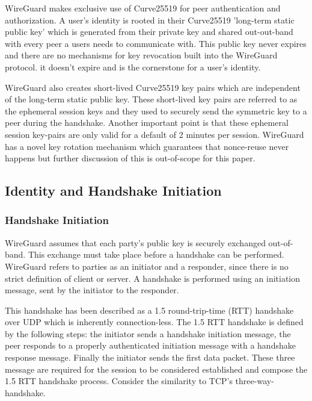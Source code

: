 \documentclass [11pt, proquest] {uwthesis}[2020/02/24]
\begin{document}
WireGuard makes exclusive use of Curve25519 for peer authentication and authorization. A user's identity is rooted in their Curve25519 'long-term static public key' which is generated from their private key and shared out-out-band with every peer a users needs to communicate with. 
This public key never expires and there are no mechanisms for key revocation built into the WireGuard protocol. it doesn't expire and is the cornerstone for a user's identity. 

WireGuard also creates short-lived Curve25519 key pairs which are independent of the long-term static public key. These short-lived key pairs are referred to as the ephemeral session keys and they used to securely send the symmetric key to a peer during the handshake. Another important point is that these ephemeral session key-pairs are only valid for a default of 2 minutes per session. WireGuard has a novel key rotation mechanism which guarantees that nonce-reuse never happens but further discussion of this is out-of-scope for this paper. 

\subsection {Identity and Handshake Initiation}

\subsubsection{Handshake Initiation}
WireGuard assumes that each party's public key is securely exchanged out-of-band. This exchange must take place before a handshake can be performed. WireGuard refers to parties as an initiator and a responder, since there is no strict definition of client or server. A handshake is performed using an initiation message, sent by the initiator to the responder. 

This handshake has been described as a 1.5 round-trip-time (RTT) handshake over UDP which is inherently connection-less. The 1.5 RTT handshake is defined by the following steps: the initiator sends a handshake initiation message, the peer responds to a properly authenticated initiation message with a handshake response message. Finally the initiator sends the first data packet. These three message are required for the session to be considered established and compose the 1.5 RTT handshake process. Consider the similarity to TCP's three-way-handshake.
\end{document}
